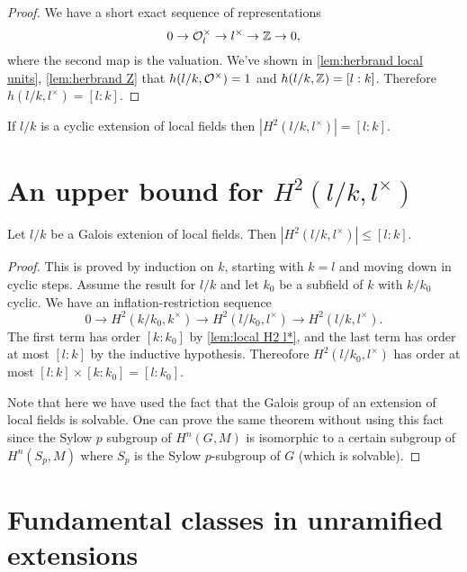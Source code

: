 \begin{proof}
	We have a short exact sequence of representations
	\[
		0 \to {\mathcal O}_l^\times \to l^\times \to {\mathbb Z} \to 0,
 	\]
	where the second map is the valuation.
	We've shown in \ref{lem:herbrand local units}, \ref{lem:herbrand Z}
	that $h(l/k,{\mathcal O}^\times)=1$ and $h(l/k,{\mathbb Z}) = [l:k]$.
	Therefore $h(l/k,l^\times) = [l:k]$.
\end{proof}


\begin{lemma} \label{lem:local H2 l*}
	If $l/k$ is a cyclic extension of local fields then $|H^2(l/k,l^\times)| = [l:k]$.
\end{lemma}




\section{An upper bound for \texorpdfstring{$H^2(l/k,l^\times)$}{$H^2(l/k,l*)$}}

\begin{theorem} \label{lem:local H2 upper bound}
	Let $l/k$ be a Galois extenion of local fields.
	Then $|H^2(l/k,l^\times)| \le [l:k]$.
\end{theorem}

\begin{proof}
	This is proved by induction on $k$, starting with $k=l$ and moving down in
	cyclic steps. Assume the result for $l/k$ and let $k_0$ be a subfield of $k$ with $k/k_0$ cyclic.
	We have an inflation-restriction sequence
	\[
		0 \to H^2(k/k_0, k^\times) \to H^2( l/k_0, l^\times) \to H^2(l/k, l^\times).
	\]
	The first term has order $[k : k_0]$ by \ref{lem:local H2 l*}, and the last term has
	order at most $[l:k]$ by the inductive hypothesis.
	Thereofore $H^2( l/k_0, l^\times)$ has order at most $[l:k] \times [k : k_0] = [l: k_0]$.

	Note that here we have used the fact that the Galois group of an extension of local fields is
	solvable.
	One can prove the same theorem without using this fact since the Sylow $p$ subgroup
	of $H^n(G,M)$ is isomorphic to a certain subgroup of $H^n(S_p,M)$ where $S_p$ is
	the Sylow $p$-subgroup of $G$ (which is solvable).
\end{proof}







\section{Fundamental classes in unramified extensions}

